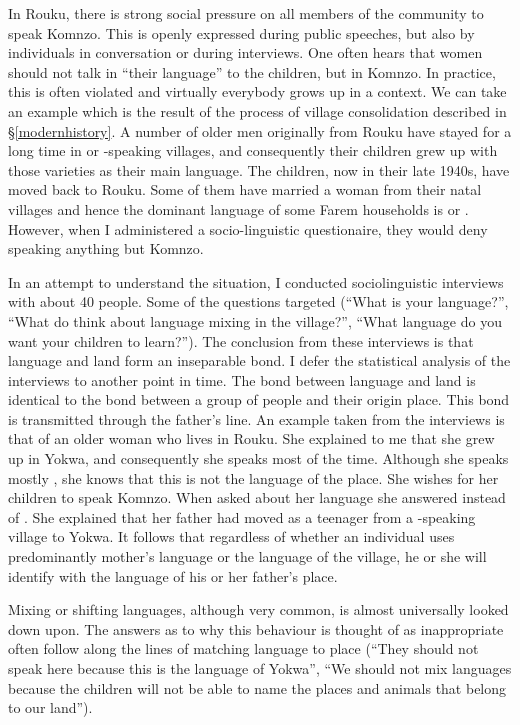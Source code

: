 In Rouku, there is strong social pressure on all members of the community to speak Komnzo. This is openly expressed during public speeches, but also by individuals in conversation or during interviews. One often hears that women should not talk in ``their language'' to the children, but in Komnzo. In practice, this is often violated and virtually everybody grows up in a  context. We can take an example which is the result of the process of village consolidation described in \S\ref{modernhistory}. A number of older men originally from Rouku have stayed for a long time in  or -speaking villages, and consequently their children grew up with those varieties as their main language. The children, now in their late 1940s, have moved back to Rouku. Some of them have married a woman from their natal villages and hence the dominant language of some Farem households is  or . However, when I administered a socio-linguistic questionaire, they would deny speaking anything but Komnzo.

In an attempt to understand the situation, I conducted sociolinguistic interviews with about 40 people. Some of the questions targeted  (``What is your language?'', ``What do think about language mixing in the village?'', ``What language do you want your children to learn?''). The conclusion from these interviews is that language and land form an inseparable bond. I defer the statistical analysis of the interviews to another point in time. The bond between language and land is identical to the bond between a group of people and their origin place. This bond is transmitted through the father's line. An example taken from the interviews is that of an older woman who lives in Rouku. She explained to me that she grew up in Yokwa, and consequently she speaks  most of the time. Although she speaks mostly , she knows that this is not the language of the place. She wishes for her children to speak Komnzo. When asked about her language she answered  instead of . She explained that her father had moved as a teenager from a -speaking village to Yokwa. It follows that regardless of whether an individual uses predominantly mother's language or the language of the village, he or she will identify with the language of his or her father's place.

Mixing or shifting languages, although very common, is almost universally looked down upon. The answers as to why this behaviour is thought of as inappropriate often follow along the lines of matching language to place (``They should not speak  here because this is the language of Yokwa'', ``We should not mix languages because the children will not be able to name the places and animals that belong to our land'').

